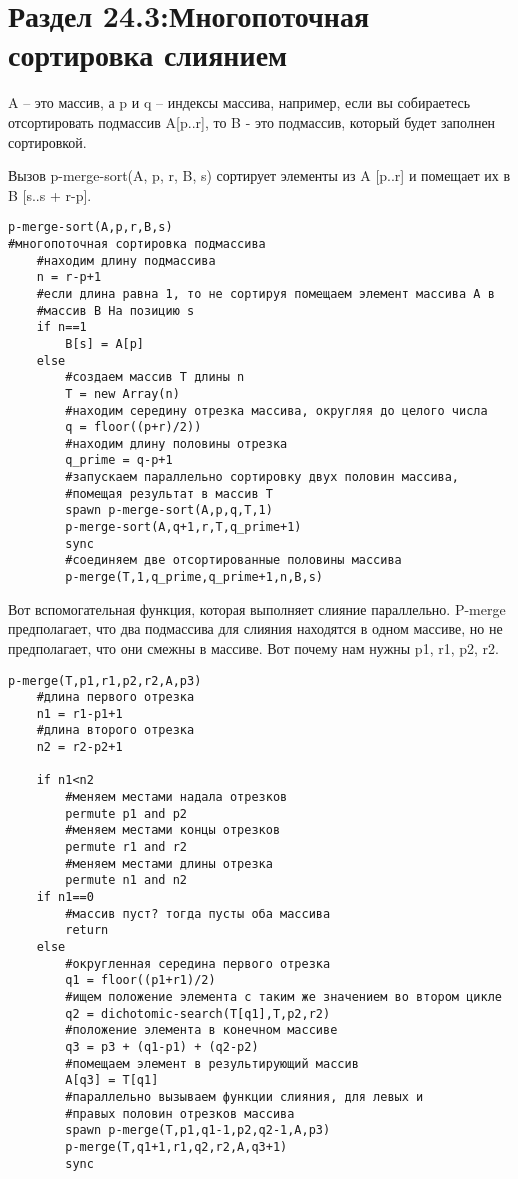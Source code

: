 \section*{Раздел 24.3:Многопоточная сортировка слиянием}

A -- это массив, а p и q -- индексы массива, например, если вы собираетесь отсортировать подмассив A[p..r], то B - это подмассив, который будет заполнен сортировкой.

\vspace{\baselineskip}

Вызов p-merge-sort(A, p, r, B, s) сортирует элементы из A [p..r] и помещает их в B [s..s + r-p].

\begin{tcolorbox}
\begin{verbatim}
p-merge-sort(A,p,r,B,s)
#многопоточная сортировка подмассива
    #находим длину подмассива
    n = r-p+1
    #если длина равна 1, то не сортируя помещаем элемент массива A в 
    #массив B На позицию s
    if n==1
        B[s] = A[p]
    else
        #создаем массив T длины n
        T = new Array(n) 
        #находим середину отрезка массива, округляя до целого числа
        q = floor((p+r)/2))
        #находим длину половины отрезка
        q_prime = q-p+1
        #запускаем параллельно сортировку двух половин массива, 
        #помещая результат в массив T
        spawn p-merge-sort(A,p,q,T,1)
        p-merge-sort(A,q+1,r,T,q_prime+1)
        sync
        #соединяем две отсортированные половины массива
        p-merge(T,1,q_prime,q_prime+1,n,B,s)
\end{verbatim}
\end{tcolorbox}

Вот вспомогательная функция, которая выполняет слияние параллельно. P-merge предполагает, что два подмассива для слияния находятся в одном массиве, но не предполагает, что они смежны в массиве. Вот почему нам нужны p1, r1, p2, r2.

\begin{tcolorbox}
\begin{verbatim}
p-merge(T,p1,r1,p2,r2,A,p3)
    #длина первого отрезка
    n1 = r1-p1+1
    #длина второго отрезка
    n2 = r2-p2+1

    if n1<n2
        #меняем местами надала отрезков
        permute p1 and p2
        #меняем местами концы отрезков
        permute r1 and r2
        #меняем местами длины отрезка
        permute n1 and n2
    if n1==0
        #массив пуст? тогда пусты оба массива
        return
    else
        #округленная середина первого отрезка
        q1 = floor((p1+r1)/2)
        #ищем положение элемента с таким же значением во втором цикле
        q2 = dichotomic-search(T[q1],T,p2,r2)
        #положение элемента в конечном массиве
        q3 = p3 + (q1-p1) + (q2-p2)
        #помещаем элемент в результирующий массив 
        A[q3] = T[q1]
        #параллельно вызываем функции слияния, для левых и 
        #правых половин отрезков массива
        spawn p-merge(T,p1,q1-1,p2,q2-1,A,p3)
        p-merge(T,q1+1,r1,q2,r2,A,q3+1)
        sync
\end{verbatim}
\end{tcolorbox}

